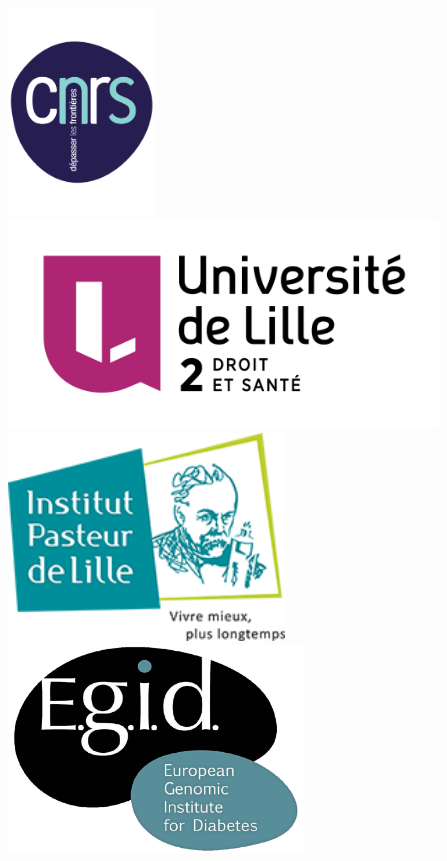 \documentclass[10pt,a0,portrait]{a0poster}
\begin{document}
\begin{center}
    \vfill
    {\includegraphics[height=5.5cm, keepaspectratio]{figures/logo_cnrs.pdf}
    \hspace{11cm} \includegraphics[height=5.5cm, keepaspectratio]{figures/UL2-WEB-2014.png}
    \hspace{8cm} \includegraphics[height=5.5cm, keepaspectratio]{figures/Institut-Pasteur-de-Lille.png}
    \hspace{11cm} \includegraphics[height=5.5cm, keepaspectratio]{figures/logo_egid.pdf}}
\end{center}


\end{document}
